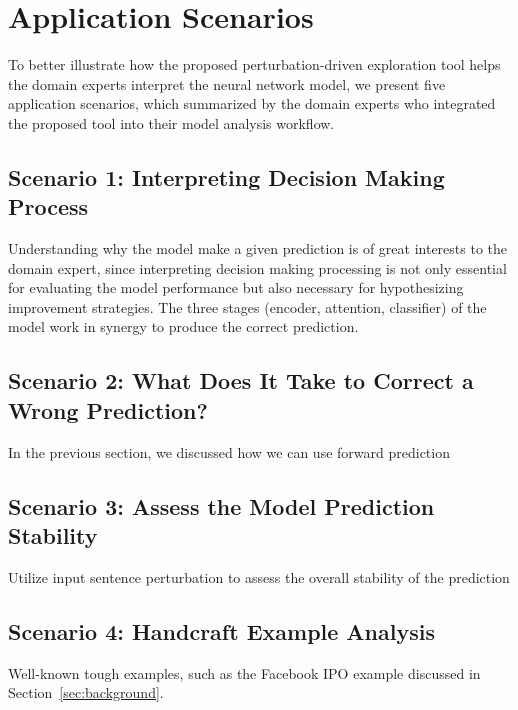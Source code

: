 \section{Application Scenarios}
\label{sec:caseStudy}
To better illustrate how the proposed perturbation-driven exploration tool helps the domain experts interpret the neural network model, we present five application scenarios, which summarized by the domain experts who integrated the proposed tool into their model analysis workflow.

\subsection{Scenario 1: Interpreting Decision Making Process}
Understanding why the model make a given prediction is of great interests to the domain expert, 
since interpreting decision making processing is not only essential for evaluating the model performance but also necessary for hypothesizing improvement strategies.
%
The three stages (encoder, attention, classifier) of the model work in synergy to produce the correct prediction.
%

\subsection{Scenario 2: What Does It Take to Correct a Wrong Prediction?}
In the previous section, we discussed how we can use forward prediction

\subsection{Scenario 3: Assess the Model Prediction Stability}
Utilize input sentence perturbation to assess the overall stability of the prediction

\subsection{Scenario 4: Handcraft Example Analysis}
Well-known tough examples, such as the Facebook IPO example discussed in Section~\ref{sec:background}.

